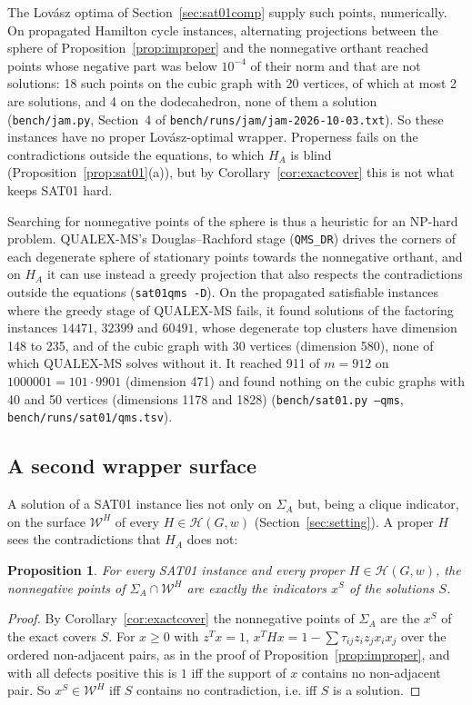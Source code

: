 \documentclass[11pt]{article}
\newtheorem{prop}[thm]{Proposition}
\theoremstyle{definition}
\theoremstyle{remark}
\newcommand{\Hc}{\mathcal{H}}
\newcommand{\Wc}{\mathcal{W}}
\begin{document}
The Lov\'asz optima of Section~\ref{sec:sat01comp} supply such points,
numerically. On propagated Hamilton cycle instances, alternating projections
between the sphere of Proposition~\ref{prop:improper} and the nonnegative
orthant reached points whose negative part was below $10^{-4}$ of their
norm and that are not solutions: 18 such points on the cubic graph with 20
vertices, of which at most 2 are solutions, and 4 on the dodecahedron, none
of them a solution (\texttt{bench/jam.py}, Section~4 of
\texttt{bench/runs/jam/jam-2026-10-03.txt}). So these instances have no
proper Lov\'asz-optimal wrapper. Properness fails on the contradictions
outside the equations, to which $H_A$ is blind
(Proposition~\ref{prop:sat01}(a)), but by Corollary~\ref{cor:exactcover}
this is not what keeps SAT01 hard.

Searching for nonnegative points of the sphere is thus a heuristic for an
NP-hard problem. QUALEX-MS's Douglas--Rachford stage (\texttt{QMS\_DR}) drives
the corners of each degenerate sphere of stationary points towards the
nonnegative orthant, and on $H_A$ it can use instead a greedy projection
that also respects the contradictions outside the equations
(\texttt{sat01qms -D}). On the propagated satisfiable instances where the
greedy stage of QUALEX-MS fails, it found solutions of the factoring
instances $14471$, $32399$ and $60491$, whose degenerate top clusters have
dimension 148 to 235, and of the cubic graph with 30 vertices (dimension
580), none of which QUALEX-MS solves without it. It reached 911 of $m=912$
on $1000001=101\cdot9901$ (dimension 471) and found nothing on the cubic
graphs with 40 and 50 vertices (dimensions 1178 and 1828)
(\texttt{bench/sat01.py --qms}, \texttt{bench/runs/sat01/qms.tsv}).

\subsection{A second wrapper surface}
\label{sec:surface}

A solution of a SAT01 instance lies not only on $\Sigma_A$ but, being a
clique indicator, on the surface $\Wc^H$ of every $H\in\Hc(G,w)$
(Section~\ref{sec:setting}). A proper $H$ sees the contradictions that $H_A$
does not:

\begin{prop}
\label{prop:threesets}
For every SAT01 instance and every proper $H\in\Hc(G,w)$, the nonnegative
points of $\Sigma_A\cap\Wc^H$ are exactly the indicators $x^S$ of the
solutions $S$.
\end{prop}
\begin{proof}
By Corollary~\ref{cor:exactcover} the nonnegative points of $\Sigma_A$ are
the $x^S$ of the exact covers $S$. For $x\geq0$ with $z^Tx=1$,
$x^THx=1-\sum\tau_{ij}z_iz_jx_ix_j$ over the ordered non-adjacent pairs, as
in the proof of Proposition~\ref{prop:improper}, and with all defects
positive this is $1$ iff the support of $x$ contains no non-adjacent pair.
So $x^S\in\Wc^H$ iff $S$ contains no contradiction, i.e. iff $S$ is a
solution.
\end{proof}
\end{document}
